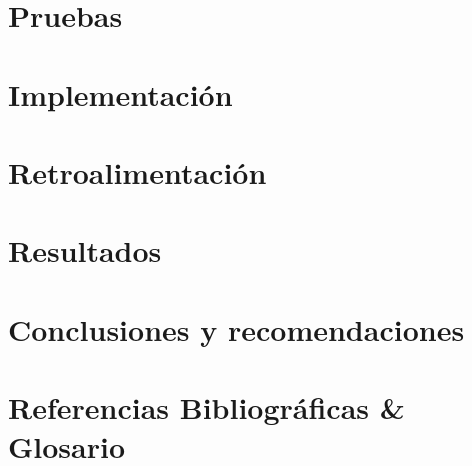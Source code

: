 \documentclass[12pt]{book} %
\begin{document}
\section{Pruebas}

\section{Implementación}

\section{Retroalimentación}

\section{Resultados}

\section{Conclusiones y recomendaciones}

\section{Referencias Bibliográficas \& Glosario} 	
\newpage


\printnoidxglossaries
{}




\begin{thebibliography}{99} %









\end{thebibliography}


 
\end{document}

